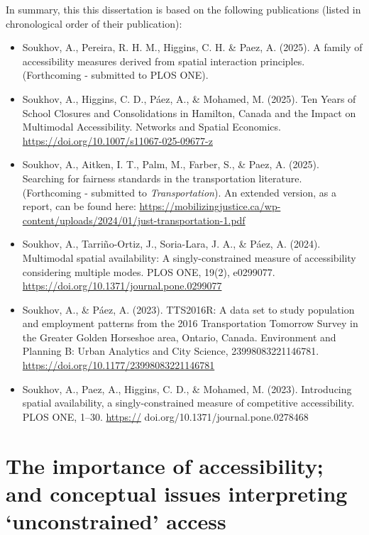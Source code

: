\documentclass[
11pt, %
oneside, %
english, %
singlespacing, %
]{macthesis} %
\def\tightlist{}
\begin{document}
In summary, this this dissertation is based on the following publications (listed in chronological order of their publication):

\begin{itemize}
\tightlist
\item
  Soukhov, A., Pereira, R. H. M., Higgins, C. H. \& Paez, A. (2025). A family of accessibility measures derived from spatial interaction principles. (Forthcoming - submitted to PLOS ONE).
\item
  Soukhov, A., Higgins, C. D., Páez, A., \& Mohamed, M. (2025). Ten Years of School Closures and Consolidations in Hamilton, Canada and the Impact on Multimodal Accessibility. Networks and Spatial Economics. \url{https://doi.org/10.1007/s11067-025-09677-z}
\item
  Soukhov, A., Aitken, I. T., Palm, M., Farber, S., \& Paez, A. (2025). Searching for fairness standards in the transportation literature. (Forthcoming - submitted to \emph{Transportation}). An extended version, as a report, can be found here: \url{https://mobilizingjustice.ca/wp-content/uploads/2024/01/just-transportation-1.pdf}
\item
  Soukhov, A., Tarriño-Ortiz, J., Soria-Lara, J. A., \& Páez, A. (2024). Multimodal spatial availability: A singly-constrained measure of accessibility considering multiple modes. PLOS ONE, 19(2), e0299077. \url{https://doi.org/10.1371/journal.pone.0299077}
\item
  Soukhov, A., \& Páez, A. (2023). TTS2016R: A data set to study population and employment patterns from the 2016 Transportation Tomorrow Survey in the Greater Golden Horseshoe area, Ontario, Canada. Environment and Planning B: Urban Analytics and City Science, 23998083221146781. \url{https://doi.org/10.1177/23998083221146781}
\item
  Soukhov, A., Paez, A., Higgins, C. D., \& Mohamed, M. (2023). Introducing spatial availability, a singly-constrained measure of competitive accessibility. PLOS ONE, 1--30. \url{https://} doi.org/10.1371/journal.pone.0278468
\end{itemize}

\section{The importance of accessibility; and conceptual issues interpreting `unconstrained' access}\label{the-importance-of-accessibility-and-conceptual-issues-interpreting-unconstrained-access}
\end{document}

